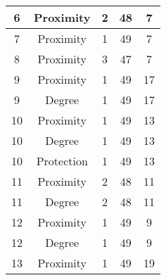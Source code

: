\documentclass[results.tex]{subfiles}
\begin{document}
\begin{center}
\begin{tabular}{| c || c | c | c | c |}
            \hline
            6                       & Proximity                    & 2                      & 48                      & 7                    \\
            \hline
            7                       & Proximity                    & 1                      & 49                      & 7                    \\
            \hline
            8                       & Proximity                    & 3                      & 47                      & 7                    \\
            \hline
            9                       & Proximity                    & 1                      & 49                      & 17                   \\
            \hline
            9                       & Degree                       & 1                      & 49                      & 17                   \\
            \hline
            10                      & Proximity                    & 1                      & 49                      & 13                   \\
            \hline
            10                      & Degree                       & 1                      & 49                      & 13                   \\
            \hline
            10                      & Protection                   & 1                      & 49                      & 13                   \\
            \hline
            11                      & Proximity                    & 2                      & 48                      & 11                   \\
            \hline
            11                      & Degree                       & 2                      & 48                      & 11                   \\
            \hline
            12                      & Proximity                    & 1                      & 49                      & 9                    \\
            \hline
            12                      & Degree                       & 1                      & 49                      & 9                    \\
            \hline
            13                      & Proximity                    & 1                      & 49                      & 19                   \\

\end{tabular}
\end{center}
\end{document}
